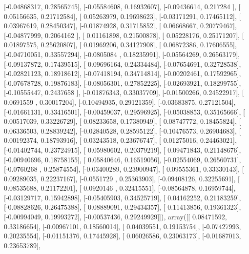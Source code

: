 \documentclass{article}
\begin{document}
       [-0.04868317,  0.28565745],
       [-0.05584608,  0.16932607],
       [-0.09436614,  0.217284  ],
       [ 0.05156635,  0.21712584],
       [ 0.05263979,  0.19698623],
       [-0.03171291,  0.17465112],
       [ 0.03967619,  0.28450347],
       [-0.01874928,  0.31715852],
       [ 0.06668667,  0.20779467],
       [-0.04877999,  0.2064162 ],
       [ 0.01161898,  0.21500878],
       [ 0.05228176,  0.25171207],
       [ 0.01897575,  0.25620807],
       [ 0.01969206,  0.34127908],
       [ 0.06872386,  0.17606555],
       [-0.04710051,  0.33557294],
       [-0.0805084 ,  0.18235991],
       [-0.05564269,  0.26563179],
       [-0.09137872,  0.17439515],
       [ 0.09696164,  0.24334484],
       [-0.07654691,  0.32728538],
       [-0.02821123,  0.18918612],
       [-0.07418194,  0.34714814],
       [-0.00202461,  0.17592965],
       [-0.07678728,  0.19876183],
       [-0.08056301,  0.27852225],
       [-0.02693921,  0.18299755],
       [-0.10555447,  0.2437658 ],
       [-0.01876343,  0.33037709],
       [-0.01500266,  0.24522917],
       [ 0.0691559 ,  0.30017204],
       [-0.10494935,  0.29121359],
       [-0.03683875,  0.27121504],
       [-0.01661131,  0.33416501],
       [-0.00459037,  0.29596925],
       [-0.05038853,  0.35165666],
       [ 0.00517039,  0.33226729],
       [ 0.08233658,  0.17380949],
       [ 0.08747772,  0.18455824],
       [ 0.06336503,  0.28839242],
       [-0.02840528,  0.28595122],
       [-0.10476573,  0.26904683],
       [ 0.00192374,  0.18793916],
       [ 0.03243518,  0.23676747],
       [ 0.01275016,  0.24463021],
       [-0.01402744,  0.23724915],
       [ 0.05980602,  0.20379219],
       [ 0.09471843,  0.21148676],
       [-0.00940696,  0.18758155],
       [ 0.05840646,  0.16519056],
       [-0.02554069,  0.26560731],
       [-0.0760268 ,  0.25874554],
       [-0.03400289,  0.23900947],
       [ 0.09555361,  0.33330143],
       [ 0.09289035,  0.22237167],
       [-0.0551729 ,  0.25363903],
       [-0.09408126,  0.32255691],
       [ 0.08535688,  0.21172201],
       [ 0.0920146 ,  0.32415551],
       [-0.08564878,  0.16959744],
       [-0.03129717,  0.15942898],
       [-0.05405903,  0.34525719],
       [ 0.04162252,  0.21183259],
       [-0.08828626,  0.26475388],
       [ 0.08889091,  0.29434357],
       [ 0.11413856,  0.19361323],
       [-0.00994049,  0.19993272],
       [-0.00537436,  0.29249929]]), array([[ 0.08471592,  0.33186654],
       [-0.00967101,  0.18560014],
       [ 0.04039551,  0.19153754],
       [-0.07427993,  0.20235554],
       [-0.01151376,  0.17445928],
       [ 0.06026586,  0.23063173],
       [-0.01687013,  0.23653789],
\end{document}
